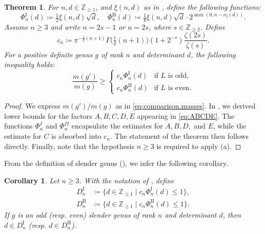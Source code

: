 \documentclass[a4paper]{amsart}
\theoremstyle{definition}
\theoremstyle{plain}
\newtheorem{theorem}[definition]{Theorem}
\newtheorem{corollary}[definition]{Corollary}
\newcommand{\IZ}{\mathbb{Z}}
\newcommand{\I}{\mathrm{I}}
\newcommand{\II}{\mathrm{II}}
\begin{document}
\begin{theorem} \label{thm:bound.rank.>2}
For \(n, d \in \IZ_{\geq 1}\), and $\xi(n,d)$ as in , define the following functions:
\[
\Phi_n^\I(d) \coloneqq \tfrac{1}{2} \xi(n,d) \sqrt{d}, \quad  
\Phi_n^\II(d) \coloneqq \tfrac{1}{8} \xi(n,d) \sqrt{d} \cdot 2^{\max(0, n - \nu_2(d))}.
\]
Assume \(n \geq 3\) and write \(n = 2s - 1\) or \(n = 2s\), where \(s \in \IZ_{\geq 2}\). Define
\[
c_n \coloneqq \pi^{-\frac{1}{2}(n+1)} \Gamma\big(\tfrac{1}{2}(n+1)\big) (1 + 2^{-s}) \frac{\zeta(2s)}{\zeta(s)}.
\]
For a positive definite genus \(g\) of rank \(n\) and determinant \(d\), the following inequality holds:
\[
\frac{m(g')}{m(g)} \geq  
\begin{cases}  
    c_n \Phi_n^\I(d) & \text{if \(L\) is odd,} \\  
    c_n \Phi_n^\II(d) & \text{if \(L\) is even.}  
\end{cases}
\]
\end{theorem}
\begin{proof}
	We express \(m(g')/m(g)\) as in \eqref{eq:comparison.masses}. 
    In , we derived lower bounds for the factors \(A, B, C, D, E\) appearing in \eqref{eq:ABCDE}. The functions \(\Phi_n^I\) and \(\Phi_n^{II}\) encapsulate the estimates for \(A, B, D,\) and \(E\), while the estimate for \(C\) is absorbed into \(c_n\). 
    The statement of the theorem then follows directly.  
    Finally, note that the hypothesis \(n \geq 3\) is required to apply (a).
\end{proof}

From the definition of slender genus (), we infer the following corollary.

\begin{corollary} \label{cor:DIn}
Let \(n \geq 3\). With the notation of , define
\begin{align*}
    D_n^\I & \coloneqq \{ d \in \IZ_{\geq 1} \mid c_n \Phi_n^\I(d) \leq 1 \}, \\
    D_n^\II & \coloneqq \{ d \in \IZ_{\geq 1} \mid c_n \Phi_n^\II(d) \leq 1 \}.
\end{align*}
If \(g\) is an odd (resp. even) slender genus of rank \(n\) and determinant \(d\), then \(d \in D^\I_n\) (resp. \(d \in D^\II_n\)).
\end{corollary}
\end{document}
